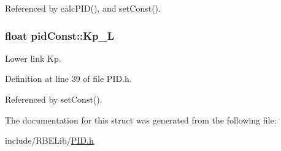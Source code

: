 Referenced by calc\-P\-I\-D(), and set\-Const().

\hypertarget{structpid_const_a0e30018aca6e06a3c00d16b39f3f0133}{
\subsubsection[{Kp\-\_\-\-L}]{\setlength{\rightskip}{0pt plus 5cm}float pid\-Const\-::\-Kp\-\_\-\-L}}\label{structpid_const_a0e30018aca6e06a3c00d16b39f3f0133}


Lower link Kp. 



Definition at line 39 of file P\-I\-D.\-h.



Referenced by set\-Const().



The documentation for this struct was generated from the following file\-:\begin{DoxyCompactItemize}
\item 
include/\-R\-B\-E\-Lib/\hyperlink{_p_i_d_8h}{P\-I\-D.\-h}\end{DoxyCompactItemize}

